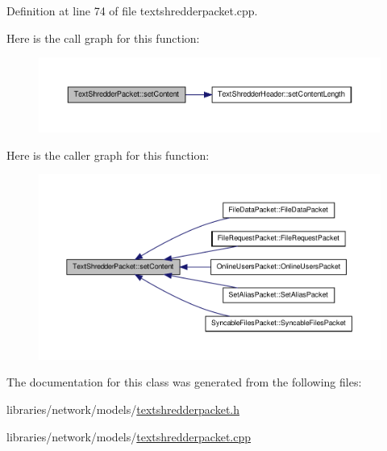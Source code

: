 Definition at line 74 of file textshredderpacket.cpp.



Here is the call graph for this function:\nopagebreak
\begin{figure}[H]
\begin{center}
\leavevmode
\includegraphics[width=400pt]{class_text_shredder_packet_a5f40205dff89b280506ee90c7990f2a2_cgraph}
\end{center}
\end{figure}




Here is the caller graph for this function:\nopagebreak
\begin{figure}[H]
\begin{center}
\leavevmode
\includegraphics[width=400pt]{class_text_shredder_packet_a5f40205dff89b280506ee90c7990f2a2_icgraph}
\end{center}
\end{figure}




The documentation for this class was generated from the following files:\begin{DoxyCompactItemize}
\item 
libraries/network/models/\hyperlink{textshredderpacket_8h}{textshredderpacket.h}\item 
libraries/network/models/\hyperlink{textshredderpacket_8cpp}{textshredderpacket.cpp}\end{DoxyCompactItemize}
